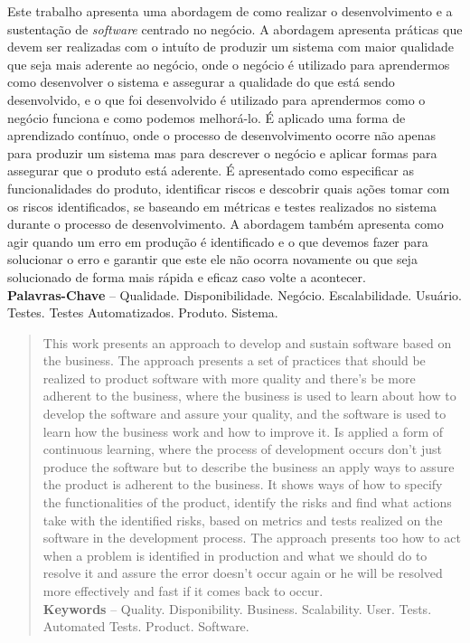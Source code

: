 \begin{resumo}
  Este trabalho apresenta uma abordagem de como realizar o desenvolvimento e
  a sustentação de \textit{software} centrado no negócio. A abordagem apresenta
  práticas que devem ser realizadas com o intuíto de produzir um sistema com maior
  qualidade que seja mais aderente ao negócio, onde o negócio é utilizado para
  aprendermos como desenvolver o sistema e assegurar a qualidade do que está
  sendo desenvolvido, e o que foi desenvolvido é utilizado para aprendermos como
  o negócio funciona e como podemos melhorá-lo. É aplicado uma forma de aprendizado
  contínuo, onde o processo de desenvolvimento ocorre não apenas para produzir um
  sistema mas para descrever o negócio e aplicar formas para assegurar que o
  produto está aderente. É apresentado como especificar as funcionalidades
  do produto, identificar riscos e descobrir quais ações tomar com os riscos
  identificados, se baseando em métricas e testes realizados no sistema durante
  o processo de desenvolvimento. A abordagem também apresenta como agir quando um
  erro em produção é identificado e o que devemos fazer para solucionar o erro e
  garantir que este ele não ocorra novamente ou que seja solucionado de forma
  mais rápida e eficaz caso volte a acontecer. \\[3\baselineskip]

  \textbf{Palavras-Chave} -- Qualidade. Disponibilidade. Negócio. Escalabilidade.
  Usuário. Testes. Testes Automatizados. Produto. Sistema.
\end{resumo}

\begin{abstract}
  This work presents an approach to develop and sustain software based on the
  business. The approach presents a set of practices that should be realized to
  product software with more quality and there's be more adherent to the business,
  where the business is used to learn about how to develop the software and assure
  your quality, and the software is used to learn how the business work and how
  to improve it. Is applied a form of continuous learning, where the process of
  development occurs don't just produce the software but to describe the business
  an apply ways to assure the product is adherent to the business. It shows ways
  of how to specify the functionalities of the product, identify the risks and
  find what actions take with the identified risks, based on metrics and tests
  realized on the software in the development process. The approach presents too
  how to act when a problem is identified in production and what we should do to
  resolve it and assure the error doesn't occur again or he will be resolved more
  effectively and fast if it comes back to occur. \\[3\baselineskip]

  \textbf{Keywords} -- Quality. Disponibility. Business. Scalability.
  User. Tests. Automated Tests. Product. Software.
\end{abstract}
